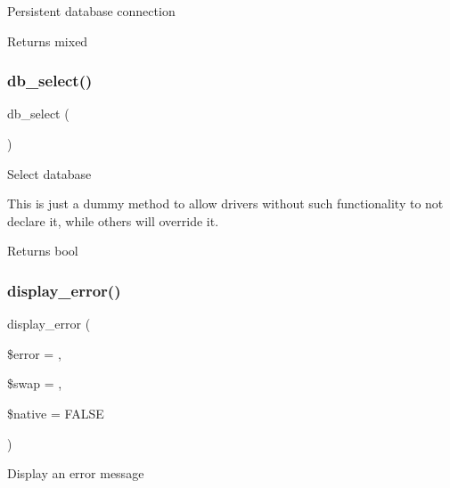 Persistent database connection

\begin{DoxyReturn}{Returns}
mixed 
\end{DoxyReturn}
\mbox{\label{class_c_i___d_b__driver_af0c7f2602586ea2050b19fb36baefb24}} 
\subsubsection{\texorpdfstring{db\+\_\+select()}{db\_select()}}
{\footnotesize\ttfamily db\+\_\+select (\begin{DoxyParamCaption}{ }\end{DoxyParamCaption})}

Select database

This is just a dummy method to allow drivers without such functionality to not declare it, while others will override it.

\begin{DoxyReturn}{Returns}
bool 
\end{DoxyReturn}
\mbox{\label{class_c_i___d_b__driver_a1ca178ae41a8c6c0e461dfb2653cfd81}} 
\subsubsection{\texorpdfstring{display\+\_\+error()}{display\_error()}}
{\footnotesize\ttfamily display\+\_\+error (\begin{DoxyParamCaption}\item[{}]{\$error = {\ttfamily \textquotesingle{}\textquotesingle{}},  }\item[{}]{\$swap = {\ttfamily \textquotesingle{}\textquotesingle{}},  }\item[{}]{\$native = {\ttfamily FALSE} }\end{DoxyParamCaption})}

Display an error message


